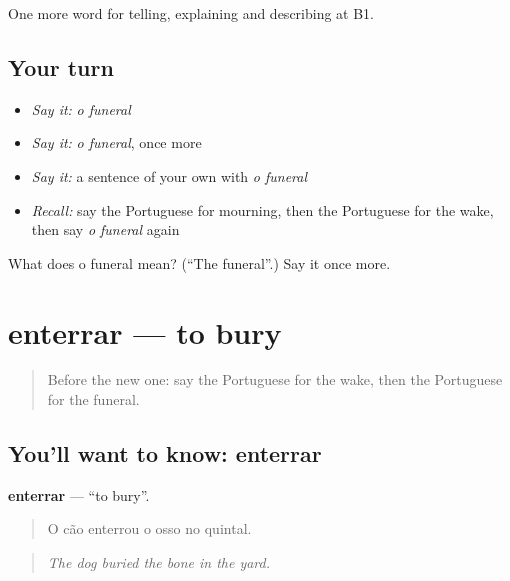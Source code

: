 \begin{grammarlens}[title={What you've built}]
One more word for telling, explaining and describing at B1.
\end{grammarlens}

\subsection*{Your turn}
\begin{itemize}
\raggedright
  \item \emph{Say it:} \emph{o funeral}
  \item \emph{Say it:} \emph{o funeral}, once more
  \item \emph{Say it:} a sentence of your own with \emph{o funeral}
  \item \emph{Recall:} say the Portuguese for mourning, then the Portuguese for the wake, then say \emph{o funeral} again
\end{itemize}

\begin{tcolorbox}[breakable,colback=teal!4,colframe=teal!35!black,title={Before you move on}]
What does o funeral mean? (\textquotedblleft{}The funeral\textquotedblright{}.) Say it once more.
\end{tcolorbox}
\section[enterrar]{enterrar — to bury}

\label{lesson:PT-C315-enterrar}



\begin{quote}
Before the new one: say the Portuguese for the wake, then the Portuguese for the funeral.
\end{quote}

\subsection*{You'll want to know: enterrar}
\textbf{enterrar} — \textquotedblleft{}to bury\textquotedblright{}.

\begin{quote}
O cão enterrou o osso no quintal.
\end{quote}

\begin{quote}
\emph{The dog buried the bone in the yard.}
\end{quote}

